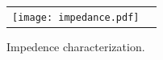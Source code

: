 \documentclass[]{article}
\begin{document}



\begin{figure}[H]
\begin{center}
\begin{tabular}{cc}
\texttt{[image: impedance.pdf]}
\end{tabular}
\caption{Impedence characterization.} %
\end{center}
\end{figure}
\end{document}
